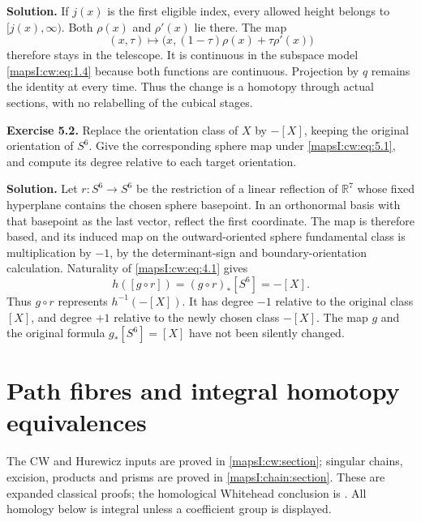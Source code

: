 \documentclass[11pt]{article}
\begin{document}
\textbf{Solution.} If \(j(x)\) is the first eligible index, every allowed height belongs to \([j(x),\infty)\). Both \(\rho(x)\) and \(\rho'(x)\) lie there. The map
\begin{equation}
(x,\tau)\longmapsto
\bigl(x,(1-\tau)\rho(x)+\tau\rho'(x)\bigr)
\label{mapsI:cw:eq:5.2}
\end{equation}
therefore stays in the telescope. It is continuous in the subspace model \eqref{mapsI:cw:eq:1.4} because both functions are continuous. Projection by \(q\) remains the identity at every time. Thus the change is a homotopy through actual sections, with no relabelling of the cubical stages.

\textbf{Exercise 5.2.}\label{mapsI:cw:exercise:5.2} Replace the orientation class of \(X\) by \(-[X]\), keeping the original orientation of \(S^6\). Give the corresponding sphere map under \eqref{mapsI:cw:eq:5.1}, and compute its degree relative to each target orientation.

\textbf{Solution.} Let \(r:S^6\to S^6\) be the restriction of a linear reflection of \(\mathbb R^7\) whose fixed hyperplane contains the chosen sphere basepoint. In an orthonormal basis with that basepoint as the last vector, reflect the first coordinate. The map is therefore based, and its induced map on the outward-oriented sphere fundamental class is multiplication by \(-1\), by the determinant-sign and boundary-orientation calculation. Naturality of \eqref{mapsI:cw:eq:4.1} gives
\begin{equation}
h([g\circ r])=(g\circ r)_*[S^6]=-[X].
\label{mapsI:cw:eq:5.3}
\end{equation}
Thus \(g\circ r\) represents \(h^{-1}(-[X])\). It has degree \(-1\) relative to the original class \([X]\), and degree \(+1\) relative to the newly chosen class \(-[X]\). The map \(g\) and the original formula \(g_*[S^6]=[X]\) have not been silently changed.

\section{Path fibres and integral homotopy equivalences}
\label{mapsI:pf:section}

The CW and Hurewicz inputs are proved in \cref{mapsI:cw:section}; singular chains, excision, products and prisms are proved in \cref{mapsI:chain:section}. These are expanded classical proofs; the homological Whitehead conclusion is \cite[Corollary~4.33]{Hatcher2002}. All homology below is integral unless a coefficient group is displayed.
\end{document}
